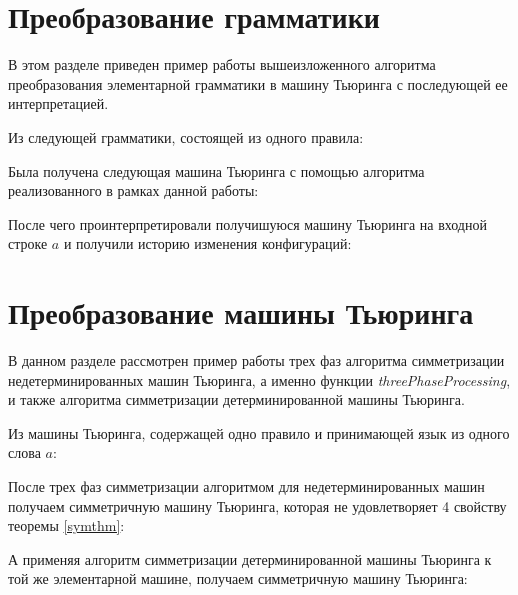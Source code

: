 \documentclass[14pt]{matmex-diploma-custom}
\begin{document}
\begin{appendices}

\section{Преобразование грамматики} \label{app:grammar_example}
В этом разделе приведен пример работы вышеизложенного алгоритма преобразования элементарной грамматики в машину Тьюринга с последующей ее интерпретацией.

Из следующей грамматики, состоящей из одного правила:


Была получена следующая машина Тьюринга с помощью алгоритма реализованного в рамках данной работы:


После чего проинтерпретировали получишуюся машину Тьюринга на входной строке $a$ и получили историю изменения конфигураций:


\section{Преобразование машины Тьюринга} \label{app:tm_example}
В данном разделе рассмотрен пример работы трех фаз алгоритма симметризации недетерминированных машин Тьюринга, а именно функции \textit{threePhaseProcessing}, и также алгоритма симметризации детерминированной машины Тьюринга.

Из машины Тьюринга, содержащей одно правило и принимающей язык из одного слова $a$: 


После трех фаз симметризации алгоритмом для недетерминированных машин получаем симметричную машину Тьюринга, которая не удовлетворяет 4 свойству теоремы \ref{symthm}: 


А применяя алгоритм симметризации детерминированной машины Тьюринга к той же элементарной машине, получаем симметричную машину Тьюринга:


\end{appendices}

\setmonofont[Mapping=tex-text]{CMU Typewriter Text}


\end{document}
